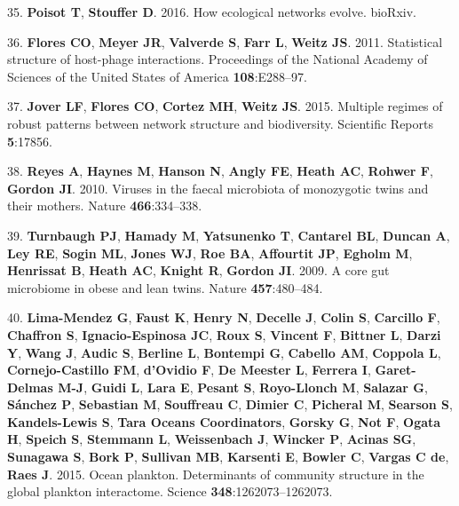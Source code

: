 \documentclass[12pt,]{article}
\begin{document}
\hypertarget{ref-Poisot071993}{}
35. \textbf{Poisot T}, \textbf{Stouffer D}. 2016. How ecological
networks evolve. bioRxiv.

\hypertarget{ref-Flores:2011bh}{}
36. \textbf{Flores CO}, \textbf{Meyer JR}, \textbf{Valverde S},
\textbf{Farr L}, \textbf{Weitz JS}. 2011. Statistical structure of
host-phage interactions. Proceedings of the National Academy of Sciences
of the United States of America \textbf{108}:E288--97.

\hypertarget{ref-Jover:2015ev}{}
37. \textbf{Jover LF}, \textbf{Flores CO}, \textbf{Cortez MH},
\textbf{Weitz JS}. 2015. Multiple regimes of robust patterns between
network structure and biodiversity. Scientific Reports \textbf{5}:17856.

\hypertarget{ref-Reyes:2010cwa}{}
38. \textbf{Reyes A}, \textbf{Haynes M}, \textbf{Hanson N},
\textbf{Angly FE}, \textbf{Heath AC}, \textbf{Rohwer F}, \textbf{Gordon
JI}. 2010. Viruses in the faecal microbiota of monozygotic twins and
their mothers. Nature \textbf{466}:334--338.

\hypertarget{ref-Turnbaugh:2009ei}{}
39. \textbf{Turnbaugh PJ}, \textbf{Hamady M}, \textbf{Yatsunenko T},
\textbf{Cantarel BL}, \textbf{Duncan A}, \textbf{Ley RE}, \textbf{Sogin
ML}, \textbf{Jones WJ}, \textbf{Roe BA}, \textbf{Affourtit JP},
\textbf{Egholm M}, \textbf{Henrissat B}, \textbf{Heath AC},
\textbf{Knight R}, \textbf{Gordon JI}. 2009. A core gut microbiome in
obese and lean twins. Nature \textbf{457}:480--484.

\hypertarget{ref-LimaMendez:2015hw}{}
40. \textbf{Lima-Mendez G}, \textbf{Faust K}, \textbf{Henry N},
\textbf{Decelle J}, \textbf{Colin S}, \textbf{Carcillo F},
\textbf{Chaffron S}, \textbf{Ignacio-Espinosa JC}, \textbf{Roux S},
\textbf{Vincent F}, \textbf{Bittner L}, \textbf{Darzi Y}, \textbf{Wang
J}, \textbf{Audic S}, \textbf{Berline L}, \textbf{Bontempi G},
\textbf{Cabello AM}, \textbf{Coppola L}, \textbf{Cornejo-Castillo FM},
\textbf{d'Ovidio F}, \textbf{De Meester L}, \textbf{Ferrera I},
\textbf{Garet-Delmas M-J}, \textbf{Guidi L}, \textbf{Lara E},
\textbf{Pesant S}, \textbf{Royo-Llonch M}, \textbf{Salazar G},
\textbf{Sánchez P}, \textbf{Sebastian M}, \textbf{Souffreau C},
\textbf{Dimier C}, \textbf{Picheral M}, \textbf{Searson S},
\textbf{Kandels-Lewis S}, \textbf{Tara Oceans Coordinators},
\textbf{Gorsky G}, \textbf{Not F}, \textbf{Ogata H}, \textbf{Speich S},
\textbf{Stemmann L}, \textbf{Weissenbach J}, \textbf{Wincker P},
\textbf{Acinas SG}, \textbf{Sunagawa S}, \textbf{Bork P},
\textbf{Sullivan MB}, \textbf{Karsenti E}, \textbf{Bowler C},
\textbf{Vargas C de}, \textbf{Raes J}. 2015. Ocean plankton.
Determinants of community structure in the global plankton interactome.
Science \textbf{348}:1262073--1262073.
\end{document}
